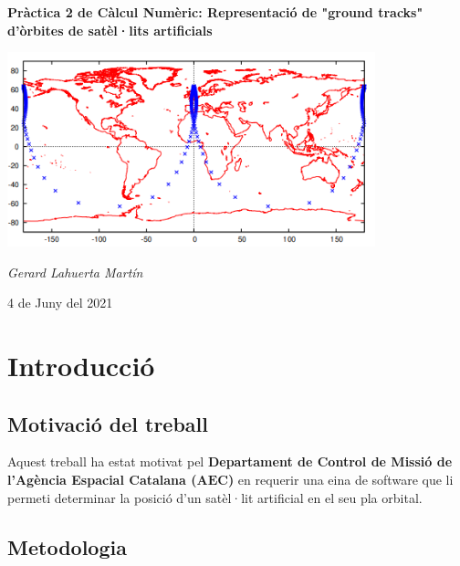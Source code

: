 \documentclass[12pt]{article}
\begin{document}
\begin{titlepage}
    \centering
    
    {\bfseries\LARGE \Huge \hspace{1em} Pràctica 2 de Càlcul Numèric: \newline Representació de "ground tracks"  d’òrbites de satèl·lits artificials\par}
    \vspace{2cm}
    {\hspace{-1em}\includegraphics[width=0.8\textwidth]{portada.PNG}\par}
    \vspace{1cm}
    \vspace{1cm}
    {\Large \itshape Gerard Lahuerta Martín \par}
    \vspace{1cm}
    {\Large 4 de Juny del 2021\par}
\end{titlepage}

\justifying

\newpage
\setcounter{page}{2}
\pagestyle{plain}
\tableofcontents
\cleardoublepage
{}


\section{Introducció}
\subsection{Motivació del treball}
Aquest treball ha estat motivat pel \textbf{Departament de Control de Missió de l'Agència Espacial Catalana ($\mathbf{AEC}$)} en requerir una eina de software que li permeti determinar la posició d'un satèl·lit artificial en el seu
pla orbital.
\subsection{Metodologia}
\end{document}
